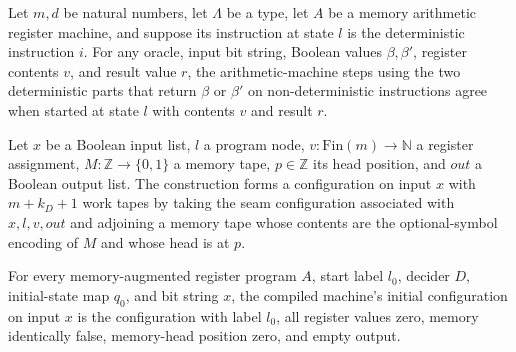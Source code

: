 \begin{lemma}
\label{Complexity.LogProg.astep_mdetPart}
\leanok
{}
Let $m,d$ be natural numbers, let $\Lambda$ be a type, let $A$ be a memory arithmetic
register machine, and suppose its instruction at state $l$ is the deterministic
instruction $i$. For any oracle, input bit string, Boolean values $\beta,\beta'$,
register contents $v$, and result value $r$, the arithmetic-machine steps using the two
deterministic parts that return $\beta$ or $\beta'$ on non-deterministic instructions
agree when started at state $l$ with contents $v$ and result $r$.
\end{lemma}

\begin{definition}
\label{Complexity.LogProg.mseam}
\leanok
{}
Let $x$ be a Boolean input list, $l$ a program node, $v\colon\mathrm{Fin}(m)\to\mathbb
N$ a register assignment, $M\colon\mathbb Z\to\{0,1\}$ a memory tape, $p\in\mathbb Z$
its head position, and $out$ a Boolean output list. The construction forms a
configuration on input $x$ with $m+k_D+1$ work tapes by taking the seam configuration
associated with $x,l,v,out$ and adjoining a memory tape whose contents are the
optional-symbol encoding of $M$ and whose head is at $p$.
\end{definition}

\begin{lemma}
\label{Complexity.LogProg.mcompileTM_init}
\leanok
{}
For every memory-augmented register program $A$, start label $l_0$, decider $D$,
initial-state map $q_0$, and bit string $x$, the compiled machine's initial
configuration on input $x$ is the configuration with label $l_0$, all register values
zero, memory identically false, memory-head position zero, and empty output.
\end{lemma}

